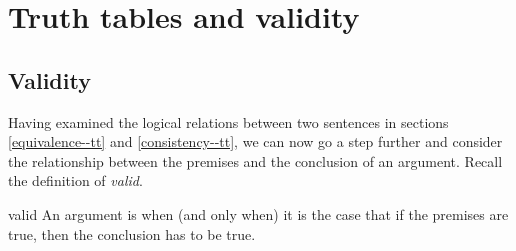 \graphicspath{{figures--tt/}}


\chapter{Truth tables and validity}\label{c:tt-validity}

\section{Validity}\label{s:tt-validity}

Having examined the logical relations between two sentences in sections \ref{equivalence--tt} and \ref{consistency--tt}, we can now go a step further and consider the relationship between the premises and the conclusion of an argument. 
Recall the definition of \textit{valid}. 
\begin{factboxy}{valid}
An argument is  when (and only when) it is the case that if the premises are true, then the conclusion has to be true.
\end{factboxy}




